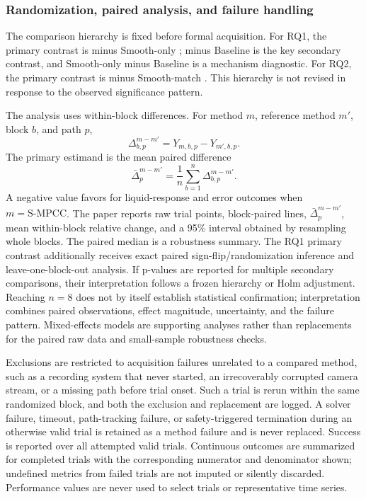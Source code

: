\subsubsection{Randomization, paired analysis, and failure handling}

The comparison hierarchy is fixed before formal acquisition. For RQ1, the
primary contrast is \SMPCC{} minus Smooth-only \MPCC{}; \SMPCC{} minus
Baseline \MPCC{} is the key secondary contrast, and Smooth-only minus Baseline
is a mechanism diagnostic. For RQ2, the primary contrast is \SMPCC{} minus
Smooth-match \MPCC{}. This hierarchy is not revised in response to the observed
significance pattern.

The analysis uses within-block differences. For method $m$, reference method
$m'$, block $b$, and path $p$,
\begin{equation}
  \Delta_{b,p}^{m-m'}
  =Y_{m,b,p}-Y_{m',b,p}.
  \label{eq:block_difference}
\end{equation}
The primary estimand is the mean paired difference
\[
  \bar\Delta_p^{m-m'}
  =\frac{1}{n}\sum_{b=1}^{n}\Delta_{b,p}^{m-m'}.
\]
A negative value favors \SMPCC{} for liquid-response and error outcomes when
$m=\mathrm{S\text{-}MPCC}$. The paper reports raw trial points, block-paired
lines, $\bar\Delta_p^{m-m'}$, mean within-block relative change, and a 95\%
interval obtained by resampling whole blocks. The paired median is a robustness
summary. The RQ1 primary contrast additionally receives exact paired
sign-flip/randomization inference and leave-one-block-out analysis. If p-values
are reported for multiple secondary comparisons, their interpretation follows
a frozen hierarchy or Holm adjustment. Reaching $n=8$ does not by itself
establish statistical confirmation; interpretation combines paired
observations, effect magnitude, uncertainty, and the failure pattern.
Mixed-effects models are supporting analyses rather than replacements for the
paired raw data and small-sample robustness checks.

Exclusions are restricted to acquisition failures unrelated to a compared
method, such as a recording system that never started, an irrecoverably
corrupted camera stream, or a missing path before trial onset. Such a trial is
rerun within the same randomized block, and both the exclusion and replacement
are logged. A solver failure, timeout, path-tracking failure, or
safety-triggered termination during an otherwise valid trial is retained as a
method failure and is never replaced. Success is reported over all attempted
valid trials. Continuous outcomes are summarized for completed trials with the
corresponding numerator and denominator shown; undefined metrics from failed
trials are not imputed or silently discarded. Performance values are never
used to select trials or representative time series.

